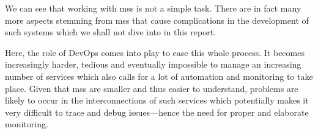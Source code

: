 We can see that working with \glspl{ms} is not a simple task.
\cite{ms-arch-study} There are in fact many more aspects stemming from
\glspl{ms} that cause complications in the development of such systems
\cite{ms-pains-gains} which we shall not dive into in this report.

Here, the role of DevOps comes into play to ease this whole process.
It becomes increasingly harder, tedious and eventually impossible to
manage an increasing number of services which also calls for a lot of
automation and monitoring to take place. Given that \glspl{ms} are
smaller and thus easier to understand, problems are likely to occur in
the interconnections of such services which potentially makes it very
difficult to trace and debug issues---hence the need for proper and
elaborate monitoring.


